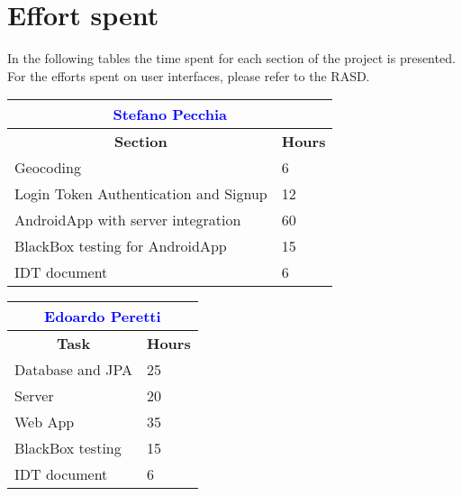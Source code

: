 \section{Effort spent}
In the following tables the time spent for each section of the project is presented. For the efforts spent on user interfaces, please refer to the RASD.

\renewcommand\arraystretch{1.5}
\begin{table}[ht]
\centering
\begin{tabular}{|l|l|}
\multicolumn{2}{c}{\textcolor{Blue}{\textbf{Stefano Pecchia}}} \\\hline
\multicolumn{1}{|c|}{\textbf{Section}} & \multicolumn{1}{|c|}{\textbf{Hours}} \\\hline
    Geocoding & 6
    \\ \hline
    Login Token Authentication and Signup & 12
    \\ \hline
    AndroidApp with server integration & 60
      \\ \hline 
    BlackBox testing for AndroidApp & 15
	\\ \hline
	IDT document & 6
		\\ \hline

	\end{tabular}
	
	 \vspace{2.5em}
	\begin{tabular}{|l|l|}
\multicolumn{2}{c}{\textcolor{Blue}{\textbf{Edoardo Peretti}}} \\\hline
\multicolumn{1}{|c|}{\textbf{Task}} & \multicolumn{1}{|c|}{\textbf{Hours}} \\\hline
Database and JPA & 25 \\
Server & 20 \\
Web App & 35 \\
BlackBox testing & 15 \\
IDT document & 6 \\
\hline
\end{tabular}
\end{table}